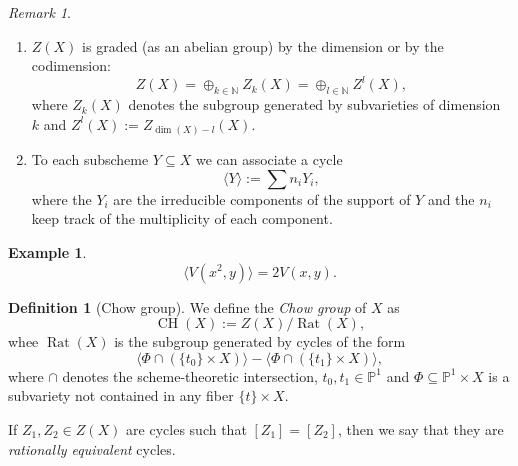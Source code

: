 \documentclass[12pt,a4paper]{amsart}
\theoremstyle{plain}
\theoremstyle{definition}
\newtheorem{defn}[thm]{Definition}
\newtheorem{exmp}[thm]{Example}
\theoremstyle{remark}
\newtheorem{rem}[thm]{Remark}
\begin{document}
\begin{rem}\mbox{ }
    \begin{enumerate}
	\item $Z(X)$ is graded (as an abelian group) by the dimension or by the codimension:
	    \[ Z(X)=\oplus_{k\in \mathbb{N}}Z_{k}(X)=\oplus_{l\in \mathbb{N}}Z^{l}(X), \]
	    where $Z_{k}(X)$ denotes the subgroup generated by subvarieties of dimension $k$ and $Z^{l}(X):=Z_{\dim(X)-l}(X)$.
	\item To each subscheme $Y\subseteq X$ we can associate a cycle
	    \[ \langle Y\rangle:=\sum n_{i}Y_{i},  \]
	    where the $Y_{i}$ are the irreducible components of the support of $Y$ and the $n_{i}$ keep track of the multiplicity of each component.
    \end{enumerate}
\end{rem}

\begin{exmp}
    \[ \langle V(x^{2},y)\rangle =2V(x,y). \]
\end{exmp}

\begin{defn}[Chow group]
    We define the \textit{Chow group} of $X$ as
    \[ \operatorname{CH}(X):=Z(X)/\operatorname{Rat}(X), \]
    whee $\operatorname{Rat}(X)$ is the subgroup generated by cycles of the form
    \[ \langle \Phi\cap (\{t_{0}\}\times X)\rangle - \langle \Phi\cap (\{t_{1}\}\times X)\rangle, \]
    where $\cap$ denotes the scheme-theoretic intersection, $t_{0},t_{1}\in \mathbb{P}^{1}$ and $\Phi\subseteq \mathbb{P}^{1}\times X$ is a subvariety not contained in any fiber $\{t\}\times X$.
\end{defn}

If $Z_{1},Z_{2}\in Z(X)$ are cycles such that $[Z_{1}]=[Z_{2}]$, then we say that they are \textit{rationally equivalent} cycles.
\end{document}
